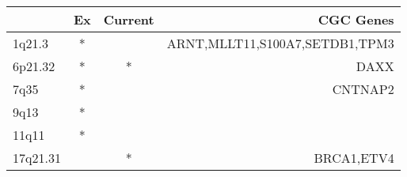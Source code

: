 \begin{tabular}{lccr}
\toprule
{} & Ex & Current &                       CGC Genes \\
\midrule
1q21.3   &  * &         &  ARNT,MLLT11,S100A7,SETDB1,TPM3 \\
6p21.32  &  * &       * &                            DAXX \\
7q35     &  * &         &                         CNTNAP2 \\
9q13     &  * &         &                                 \\
11q11    &  * &         &                                 \\
17q21.31 &    &       * &                      BRCA1,ETV4 \\
\bottomrule
\end{tabular}
